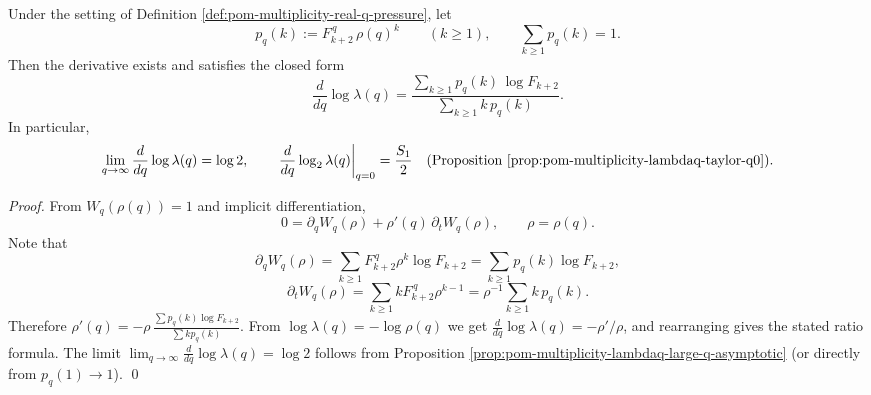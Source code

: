 \begin{proposition}\label{prop:pom-multiplicity-lambdaq-derivative-gibbs}
Under the setting of Definition \ref{def:pom-multiplicity-real-q-pressure}, let
\[
p_q(k):=F_{k+2}^{\,q}\,\rho(q)^k\qquad(k\ge 1),
\qquad
\sum_{k\ge 1}p_q(k)=1.
\]
Then the derivative exists and satisfies the closed form
\[
\boxed{\;
\frac{d}{dq}\log\lambda(q)
=\frac{\sum_{k\ge 1}p_q(k)\,\log F_{k+2}}{\sum_{k\ge 1}k\,p_q(k)}.\;}
\]
In particular,
\[
\lim_{q\to\infty}\frac{d}{dq}\log\lambda(q)=\log 2,
\qquad
\left.\frac{d}{dq}\log_2\lambda(q)\right|_{q=0}=\frac{S_1}{2}
\quad(\text{Proposition \ref{prop:pom-multiplicity-lambdaq-taylor-q0}}).
\]
\end{proposition}
\begin{proof}
From \(W_q(\rho(q))=1\) and implicit differentiation,
\[
0=\partial_q W_q(\rho)+\rho'(q)\,\partial_t W_q(\rho),
\qquad \rho=\rho(q).
\]
Note that
\[
\partial_q W_q(\rho)=\sum_{k\ge 1}F_{k+2}^{\,q}\rho^k\log F_{k+2}=\sum_{k\ge 1}p_q(k)\log F_{k+2},
\]
\[
\partial_t W_q(\rho)=\sum_{k\ge 1}kF_{k+2}^{\,q}\rho^{k-1}=\rho^{-1}\sum_{k\ge 1}k\,p_q(k).
\]
Therefore
\(
\rho'(q)=-\rho\,\frac{\sum p_q(k)\log F_{k+2}}{\sum k p_q(k)}
\).
From \(\log\lambda(q)=-\log\rho(q)\) we get
\(
\frac{d}{dq}\log\lambda(q)=-\rho'/\rho
\),
and rearranging gives the stated ratio formula.
The limit \(\lim_{q\to\infty}\frac{d}{dq}\log\lambda(q)=\log 2\) follows from Proposition \ref{prop:pom-multiplicity-lambdaq-large-q-asymptotic} (or directly from \(p_q(1)\to 1\)). \qed
\end{proof}

\endinput




